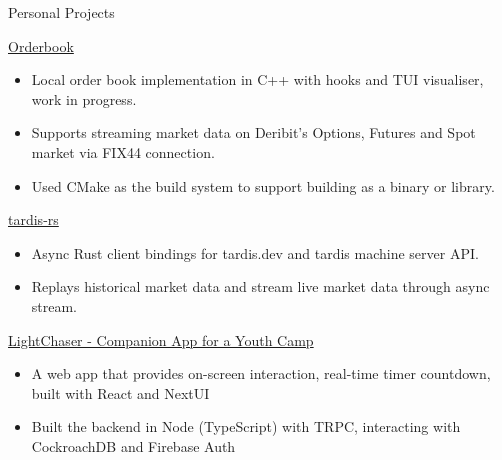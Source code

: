 \documentclass{article}
\newlength{\tabin}
\newlength{\secsep}
\newcommand{\lineunder}{\vspace*{-8pt} \\ \hspace*{-6pt} \hrulefill \\ \vspace*{-15pt}}
\newenvironment{tabbedsection}[1]{
  \begin{list}{}{
      \setlength{\itemsep}{0pt}
      \setlength{\labelsep}{0pt}
      \setlength{\labelwidth}{0pt}
      \setlength{\leftmargin}{\tabin}
      \setlength{\rightmargin}{\tabin}
      \setlength{\listparindent}{0pt}
      \setlength{\parsep}{0pt}
      \setlength{\parskip}{0pt}
      \setlength{\partopsep}{0pt}
      \setlength{\topsep}{#1}
    }
  \item[]
}{\end{list}}
\newenvironment{resume_section}[1]{
  \filbreak
  \vspace{2\secsep}
  \textsc{\large#1}
  \lineunder
  \begin{tabbedsection}{\secsep}
}{\end{tabbedsection}}
\newenvironment{resume_subsection}[2][]{
  \textbf{#2} \hfill {\footnotesize #1} \hspace{2em}
  \begin{tabbedsection}{0.5\secsep}
}{\end{tabbedsection}}
\newenvironment{subitems}{
  \renewcommand{\labelitemi}{-}
  \begin{itemize}
      \setlength{\labelsep}{1em}
}{\end{itemize}}
\begin{document}
\begin{resume_section}{Personal Projects}
  \begin{resume_subsection}[(October 2023)]{\href{https://github.com/marcustut/orderbook}{Orderbook}}
    \begin{subitems}
      \item Local order book implementation in C++ with hooks and TUI visualiser, work in progress.
      \item Supports streaming market data on Deribit's Options, Futures and Spot market via FIX44 connection.
      \item Used CMake as the build system to support building as a binary or library.
    \end{subitems}
  \end{resume_subsection}

  \begin{resume_subsection}[(September 2023)]{\href{https://github.com/cybotrade/tardis-rs}{tardis-rs}}
    \begin{subitems}
      \item Async Rust client bindings for tardis.dev and tardis machine server API.
      \item Replays historical market data and stream live market data through async stream.
    \end{subitems}
  \end{resume_subsection}

  \begin{resume_subsection}[(April 2022)]{\href{https://github.com/marcustut/lightchaser}{LightChaser - Companion App for a Youth Camp}}
    \begin{subitems}
      \item A web app that provides on-screen interaction, real-time timer countdown, built with React and NextUI
      \item Built the backend in Node (TypeScript) with TRPC, interacting with CockroachDB and Firebase Auth
    \end{subitems}
  \end{resume_subsection}



\end{resume_section}
\end{document}
